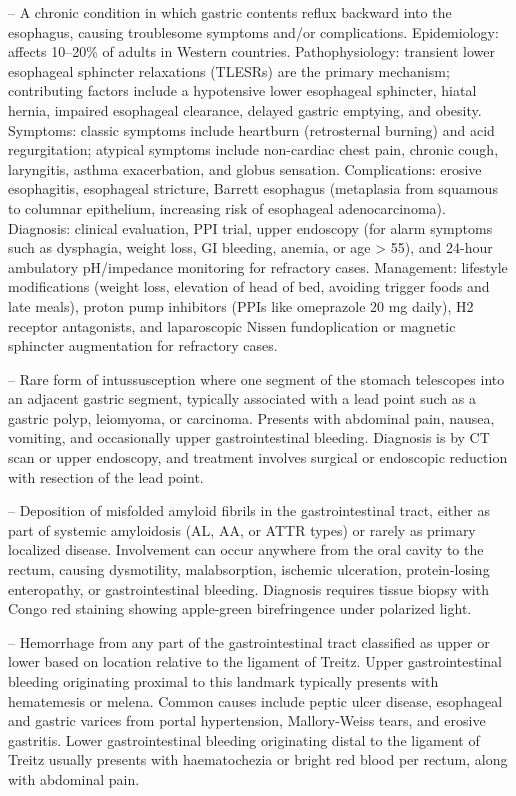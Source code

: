 -- A chronic condition in which gastric contents reflux backward into the esophagus, causing troublesome symptoms and/or complications. Epidemiology: affects 10--20\% of adults in Western countries. Pathophysiology: transient lower esophageal sphincter relaxations (TLESRs) are the primary mechanism; contributing factors include a hypotensive lower esophageal sphincter, hiatal hernia, impaired esophageal clearance, delayed gastric emptying, and obesity. Symptoms: classic symptoms include heartburn (retrosternal burning) and acid regurgitation; atypical symptoms include non-cardiac chest pain, chronic cough, laryngitis, asthma exacerbation, and globus sensation. Complications: erosive esophagitis, esophageal stricture, Barrett esophagus (metaplasia from squamous to columnar epithelium, increasing risk of esophageal adenocarcinoma). Diagnosis: clinical evaluation, PPI trial, upper endoscopy (for alarm symptoms such as dysphagia, weight loss, GI bleeding, anemia, or age > 55), and 24-hour ambulatory pH/impedance monitoring for refractory cases. Management: lifestyle modifications (weight loss, elevation of head of bed, avoiding trigger foods and late meals), proton pump inhibitors (PPIs like omeprazole 20 mg daily), H2 receptor antagonists, and laparoscopic Nissen fundoplication or magnetic sphincter augmentation for refractory cases.

-- Rare form of intussusception where one segment of the stomach telescopes into an adjacent gastric segment, typically associated with a lead point such as a gastric polyp, leiomyoma, or carcinoma. Presents with abdominal pain, nausea, vomiting, and occasionally upper gastrointestinal bleeding. Diagnosis is by CT scan or upper endoscopy, and treatment involves surgical or endoscopic reduction with resection of the lead point.

-- Deposition of misfolded amyloid fibrils in the gastrointestinal tract, either as part of systemic amyloidosis (AL, AA, or ATTR types) or rarely as primary localized disease. Involvement can occur anywhere from the oral cavity to the rectum, causing dysmotility, malabsorption, ischemic ulceration, protein-losing enteropathy, or gastrointestinal bleeding. Diagnosis requires tissue biopsy with Congo red staining showing apple-green birefringence under polarized light.

-- Hemorrhage from any part of the gastrointestinal tract classified as upper or lower based on location relative to the ligament of Treitz. Upper gastrointestinal bleeding originating proximal to this landmark typically presents with hematemesis or melena. Common causes include peptic ulcer disease, esophageal and gastric varices from portal hypertension, Mallory-Weiss tears, and erosive gastritis. Lower gastrointestinal bleeding originating distal to the ligament of Treitz usually presents with haematochezia or bright red blood per rectum, along with abdominal pain.

